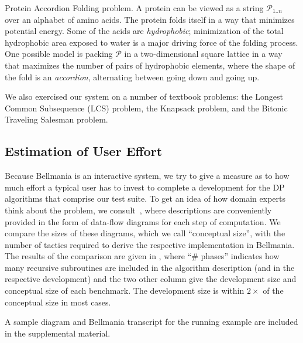 \begin{paragraph}{Protein Accordion Folding problem.} A protein can be viewed
as a string $\mathcal{P}_{1..n}$ over an alphabet of amino acids. 
The protein folds itself in a way that minimizes potential energy.
Some of the acids are {\em hydrophobic}; minimization of the total hydrophobic
area exposed to water is a major driving force of the folding process.
One possible model is packing $\mathcal{P}$ in a two-dimensional square lattice
in a way that maximizes the number of pairs of hydrophobic elements,
where the shape of the fold is an {\em accordion}, alternating between going down and going
up.
\end{paragraph}

\medskip
We also exercised our system on a number of textbook problems:
the Longest Common Subsequence (LCS) problem, the Knapsack problem,
and the Bitonic Traveling Salesman problem.

\subsection{Estimation of User Effort}
\label{evaluation:effort}

Because Bellmania is an interactive system, we try to give a measure as to how much effort a typical user has to invest
to complete a development for the DP algorithms that comprise our test suite.
To get an idea of how domain experts think about the problem, we consult~\cite{PPoPP16/Chowdhury},
where descriptions are conveniently provided in the form of data-flow diagrams for each step of computation.
We compare the sizes of these diagrams, which we call ``conceptual size'', with the number of tactics
required to derive the respective implementation in Bellmania.
The results of the comparison are given in , where ``\# phases''
indicates how many recursive subroutines are included in the algorithm description 
(and in the respective development) and the two other column give the development size and conceptual size
of each benchmark.
The development size is within $2\times$ of the conceptual size in most cases.

A sample diagram and Bellmania transcript for the running example are included in the supplemental material.

